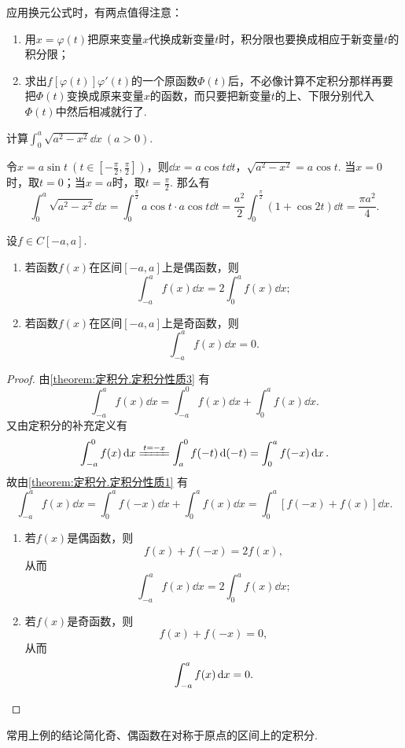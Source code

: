 应用换元公式时，有两点值得注意：\begin{enumerate}
\item 用\(x = \varphi(t)\)把原来变量\(x\)代换成新变量\(t\)时，积分限也要换成相应于新变量\(t\)的积分限；
\item 求出\(f[\varphi(t)] \varphi'(t)\)的一个原函数\(\Phi(t)\)后，不必像计算不定积分那样再要把\(\Phi(t)\)变换成原来变量\(x\)的函数，而只要把新变量\(t\)的上、下限分别代入\(\Phi(t)\)中然后相减就行了.
\end{enumerate}

\begin{example}
计算\(\int_0^a{\sqrt{a^2-x^2} \dd{x}}\ (a > 0)\).
\begin{solution}
令\(x = a \sin t\ (t \in [-\frac{\pi}{2},\frac{\pi}{2}])\)，则\(\dd{x} = a \cos t \dd{t}\)，\(\sqrt{a^2-x^2} = a \cos t\).
当\(x = 0\)时，取\(t = 0\)；当\(x = a\)时，取\(t = \frac{\pi}{2}\).
那么有\[
\int_0^a{\sqrt{a^2-x^2} \dd{x}}
= \int_0^{\frac{\pi}{2}}{a \cos t \cdot a \cos t \dd{t}}
= \frac{a^2}{2} \int_0^{\frac{\pi}{2}}{(1+\cos 2 t) \dd{t}}
= \frac{\pi a^2}{4}.
\]
\end{solution}
\end{example}

\begin{corollary}
设\(f \in C[-a,a]\).
\begin{enumerate}
\item 若函数\(f(x)\)在区间\([-a,a]\)上是偶函数，则\[
\int_{-a}^a f(x) \dd{x} = 2 \int_0^a f(x) \dd{x};
\]

\item 若函数\(f(x)\)在区间\([-a,a]\)上是奇函数，则\[
\int_{-a}^a f(x) \dd{x} = 0.
\]
\end{enumerate}
\begin{proof}
由\cref{theorem:定积分.定积分性质3} 有\[
\int_{-a}^a f(x) \dd{x} = \int_{-a}^0 f(x) \dd{x} + \int_0^a f(x) \dd{x}.
\]又由定积分的补充定义有\[
\int_{-a}^0 f(x) \dd{x}
\xlongequal{t=-x} \int_a^0 f(-t) \dd(-t)
= \int_0^a f(-x) \dd{x}.
\]故由\cref{theorem:定积分.定积分性质1} 有\[
\int_{-a}^a f(x) \dd{x}
= \int_0^a f(-x) \dd{x} + \int_0^a f(x) \dd{x}
= \int_0^a [f(-x) + f(x)] \dd{x}.
\]

\begin{enumerate}
\item 若\(f(x)\)是偶函数，则\[
f(x) + f(-x) = 2 f(x),
\]从而\[
\int_{-a}^a f(x) \dd{x} = 2 \int_0^a f(x) \dd{x};
\]

\item 若\(f(x)\)是奇函数，则\[
f(x) + f(-x) = 0,
\]从而\[
\int_{-a}^a f(x) \dd{x} = 0.
\qedhere
\]
\end{enumerate}
\end{proof}
\end{corollary}
常用上例的结论简化奇、偶函数在对称于原点的区间上的定积分.

